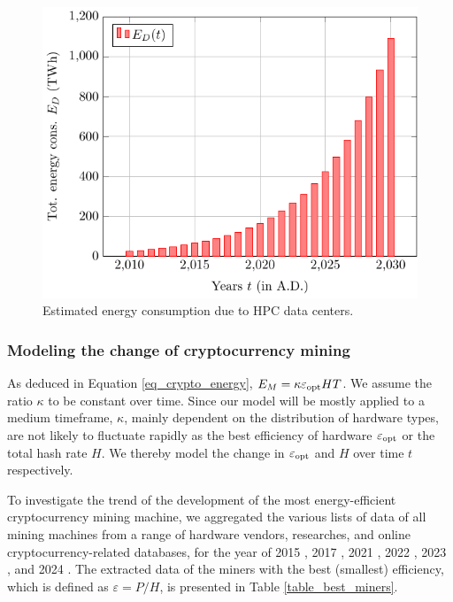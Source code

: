 \documentclass[12pt]{article}
\begin{document}
\begin{figure}[!t]
	\centering
	\includegraphics{figures/trends/datacenter_energy.pdf}
	\caption{Estimated energy consumption due to HPC data centers.}
	\label{fig_energy_datacenter}
\end{figure}

\subsubsection{Modeling the change of cryptocurrency mining}

As deduced in Equation \ref{eq_crypto_energy}, $E_M = \kappa \varepsilon_{\rm opt} HT$. We assume the ratio $\kappa$ to be constant over time. Since our model will be mostly applied to a medium timeframe, $\kappa$, mainly dependent on the distribution of hardware types, are not likely to fluctuate rapidly as the best efficiency of hardware $\varepsilon_{\rm opt}$ or the total hash rate $H$. We thereby model the change in $\varepsilon_{\rm opt}$ and $H$ over time $t$ respectively.

To investigate the trend of the development of the most energy-efficient cryptocurrency mining machine, we aggregated the various lists of data of all mining machines from a range of hardware vendors, researches, and online cryptocurrency-related databases, for the year of 2015 \citep{best_miner_2015}, 2017 \citep{btc_energy}, 2021 \citep{best_miner_2021}, 2022 \citep{best_miner_2022}, 2023 \citep{best_miner_2023}, and 2024 \citep{best_miner}. The extracted data of the miners with the best (smallest) efficiency, which is defined as $\varepsilon = P / H$, is presented in Table \ref{table_best_miners}.
\end{document}
